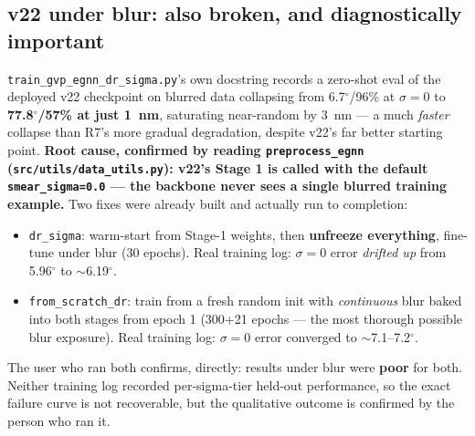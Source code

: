 \documentclass[11pt]{article}
\newcommand{\code}[1]{\texttt{#1}}
\begin{document}
\subsection{v22 under blur: also broken, and diagnostically important}
\code{train\_gvp\_egnn\_dr\_sigma.py}'s own docstring records a zero-shot eval of the
deployed v22 checkpoint on blurred data collapsing from 6.7$^\circ$/96\% at $\sigma{=}0$ to
\textbf{77.8$^\circ$/57\% at just 1~nm}, saturating near-random by 3~nm --- a much
\emph{faster} collapse than R7's more gradual degradation, despite v22's far better starting
point. \textbf{Root cause, confirmed by reading \code{preprocess\_egnn} (\code{src/utils/data\_utils.py}):
v22's Stage 1 is called with the default \code{smear\_sigma=0.0} --- the backbone never sees
a single blurred training example.} Two fixes were already built and actually run to
completion:
\begin{itemize}[leftmargin=*]
\item \code{dr\_sigma}: warm-start from Stage-1 weights, then \textbf{unfreeze everything},
      fine-tune under blur (30 epochs). Real training log: $\sigma{=}0$ error \emph{drifted
      up} from 5.96$^\circ$ to $\sim$6.19$^\circ$.
\item \code{from\_scratch\_dr}: train from a fresh random init with \emph{continuous} blur
      baked into both stages from epoch 1 (300+21 epochs --- the most thorough possible blur
      exposure). Real training log: $\sigma{=}0$ error converged to $\sim$7.1--7.2$^\circ$.
\end{itemize}
The user who ran both confirms, directly: results under blur were \textbf{poor} for both.
Neither training log recorded per-sigma-tier held-out performance, so the exact failure
curve is not recoverable, but the qualitative outcome is confirmed by the person who ran it.
\end{document}
